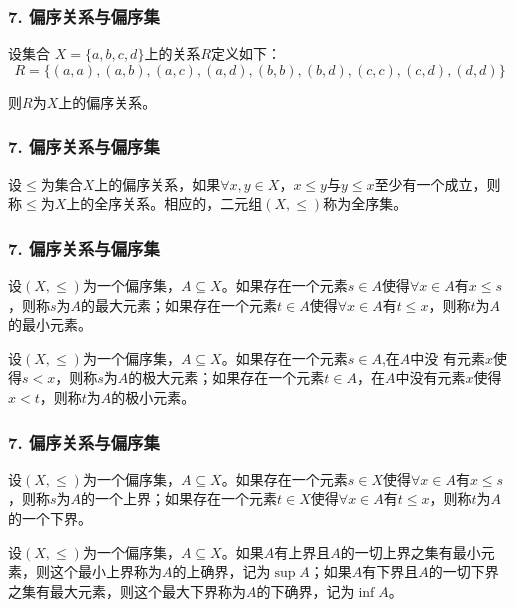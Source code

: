 \documentclass{beamer}
\begin{document}
\begin{CJK*}{UTF8}{gbsn}
\begin{frame}
  \frametitle{7. 偏序关系与偏序集}
  \begin{Ex}
    设集合
    $X=\{a,b,c,d\}$上的关系$R$定义如下：
    \begin{equation*}
      R=\{(a,a),(a,b),(a,c),(a,d),(b,b),(b,d),(c,c),(c,d),(d,d)\}
    \end{equation*}
  \end{Ex}
  则$R$为$X$上的偏序关系。
\end{frame}

\begin{frame}
\frametitle{7. 偏序关系与偏序集}
  \begin{Def}\justifying\let\raggedright\justifying
    设$\leq$为集合$X$上的偏序关系，如果$\forall x, y \in X$，$x \leq y$与$y \leq x$至少有一个成立，则称$\leq$为$X$上的\alert{全序关系}。相应的，二元组$(X,\leq)$称为\alert{全序集}。
  \end{Def}
\end{frame}
\begin{frame}
  \frametitle{7. 偏序关系与偏序集}
  \begin{Def}
    设$(X,\leq)$为一个偏序集，$A\subseteq X$。如果存在一个元素$s\in A$使得$\forall x \in A$有$x \leq s$，则称$s$为$A$的\alert{最大元素}；如果存在一个元素$t\in A$使得$\forall x \in A$有$t \leq x$，则称$t$为$A$的\alert{最小元素}。
  \end{Def}
    \begin{Def}
    设$(X,\leq)$为一个偏序集，$A\subseteq X$。如果存在一个元素$s\in A$,在$A$中没
    有元素$x$使得$s < x$，则称$s$为$A$的\alert{极大元素}；如果存在一个元素$t\in A$，在$A$中没有元素$x$使得$x < t$，则称$t$为$A$的\alert{极小元素}。
  \end{Def}
\end{frame}
\begin{frame}
  \frametitle{7. 偏序关系与偏序集}
  \begin{Def}
    设$(X,\leq)$为一个偏序集，$A\subseteq X$。如果存在一个元素$s\in X$使得$\forall x \in A$有$x \leq s$，则称$s$为$A$的一个\alert{上界}；如果存在一个元素$t\in X$使得$\forall x \in A$有$t \leq x$，则称$t$为$A$的一个\alert{下界}。
  \end{Def}
    \begin{Def}
      设$(X,\leq)$为一个偏序集，$A\subseteq X$。如果$A$有上界且$A$的一切上界之集有最小元素，则这个最小上界称为$A$的\alert{上确界}，记为$\sup A$；如果$A$有下界且$A$的一切下界之集有最大元素，则这个最大下界称为$A$的\alert{下确界}，记为$\inf A$。
  \end{Def}
\end{frame}


\end{CJK*}
\end{document}
